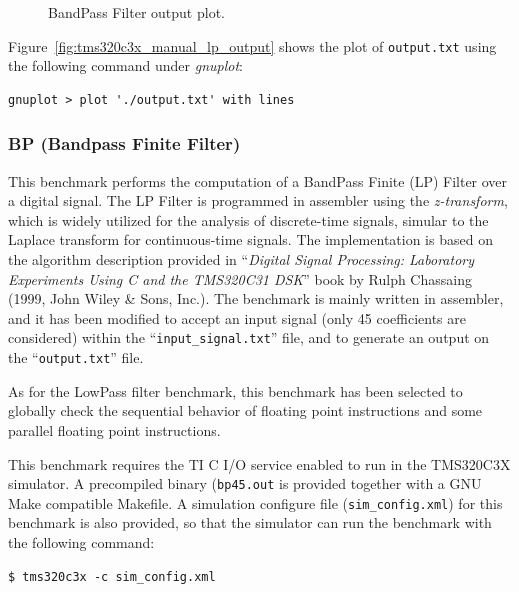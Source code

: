 \begin{figure}[!h]
\begin{center}
\begin{minipage}{\textwidth}
\begin{center}
\begin{minipage}{.45\textwidth}
\begin{center}
		\caption{\label{fig:tms320c3x_manual_bp_output} BandPass Filter output plot.}
				\end{center}
			\end{minipage}
			\end{center}
		\end{minipage}
	\end{center}
\end{figure}

Figure~\ref{fig:tms320c3x_manual_lp_output} shows the plot of \texttt{output.txt} using the following command under \textit{gnuplot}:

\begin{verbatim}
gnuplot > plot './output.txt' with lines
\end{verbatim}

\subsubsection{BP (Bandpass Finite Filter)}
\label{tms320c3x_sec:benchmarks_bp}

This benchmark performs the computation of a BandPass Finite (LP) Filter over a digital signal.
The LP Filter is programmed in assembler using the \textit{z-transform}, which is widely utilized for the analysis of discrete-time signals, simular to the Laplace transform for continuous-time signals.
The implementation is based on the algorithm description provided in ``\textit{Digital Signal Processing: Laboratory Experiments Using C and the TMS320C31 DSK}'' book by Rulph Chassaing (1999, John Wiley \& Sons, Inc.).
The benchmark is mainly written in assembler, and it has been modified to accept an input signal (only 45 coefficients are considered) within the ``\texttt{input\_signal.txt}'' file, and to generate an output on the ``\texttt{output.txt}'' file.

As for the LowPass filter benchmark, this benchmark has been selected to globally check the sequential behavior of floating point instructions and some parallel floating point instructions.

This benchmark requires the TI C I/O service enabled to run in the TMS320C3X simulator.
A precompiled binary (\texttt{bp45.out} is provided together with a GNU Make compatible Makefile.
A simulation configure file (\texttt{sim\_config.xml}) for this benchmark is also provided, so that the simulator can run the benchmark with the following command:
  
\begin{verbatim}
$ tms320c3x -c sim_config.xml
\end{verbatim}

